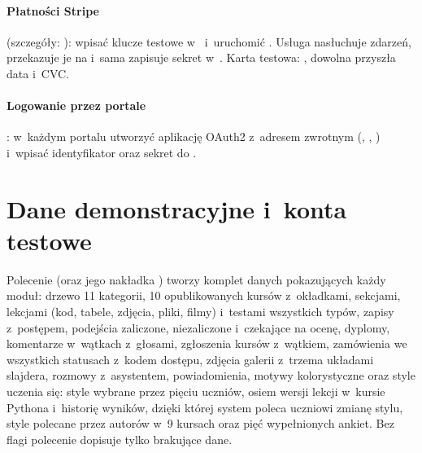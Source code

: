 \paragraph{Płatności Stripe} (szczegóły: ): wpisać klucze
testowe w~ i~uruchomić . Usługa
 nasłuchuje zdarzeń, przekazuje je na 
i~sama zapisuje sekret  w~. Karta testowa:
, dowolna przyszła data i~CVC.

\paragraph{Logowanie przez portale}: w~każdym portalu utworzyć aplikację OAuth2 z~adresem
zwrotnym 
(, , ) i~wpisać identyfikator oraz
sekret do .

\section{Dane demonstracyjne i~konta testowe}

Polecenie  (oraz jego nakładka ) tworzy komplet
danych pokazujących każdy moduł: drzewo 11 kategorii, 10 opublikowanych kursów
z~okładkami, sekcjami, lekcjami (kod, tabele, zdjęcia, pliki, filmy) i~testami wszystkich
typów, zapisy z~postępem, podejścia zaliczone, niezaliczone i~czekające na ocenę, dyplomy,
komentarze w~wątkach z~głosami, zgłoszenia kursów z~wątkiem, zamówienia we wszystkich
statusach z~kodem dostępu, zdjęcia galerii z~trzema układami slajdera, rozmowy z~asystentem,
powiadomienia, motywy kolorystyczne oraz style uczenia się: style wybrane przez pięciu
uczniów, osiem wersji lekcji w~kursie Pythona i~historię wyników, dzięki której system
poleca uczniowi  zmianę stylu, style polecane przez autorów w~9 kursach oraz pięć
wypełnionych ankiet. Bez flagi  polecenie dopisuje tylko
brakujące dane.


